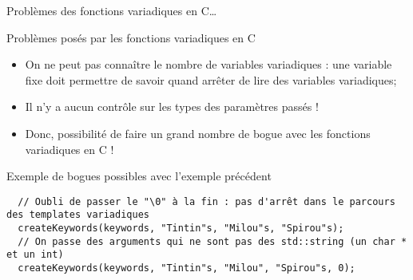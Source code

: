 \documentclass[compress,10pt,aspectratio=169]{beamer}
\begin{document}
  \begin{frame}[fragile]{Problèmes des fonctions variadiques en C\ldots}
    \scriptsize\vspace*{-3mm}
  \begin{block}{Problèmes posés par les fonctions variadiques en C}
  \begin{itemize}
  \item On ne peut pas connaître le nombre de variables variadiques : une variable
  fixe doit permettre de savoir quand arrêter de lire des variables variadiques;
  \item Il n'y a aucun contrôle sur les types des paramètres passés !
  \item Donc, possibilité de faire un grand nombre de bogue avec les fonctions
       variadiques en C !
  \end{itemize}
  \end{block}
  \begin{alertblock}{\small Exemple de bogues possibles avec l'exemple précédent}
  \begin{verbatim}
  // Oubli de passer le "\0" à la fin : pas d'arrêt dans le parcours des templates variadiques
  createKeywords(keywords, "Tintin"s, "Milou"s, "Spirou"s);
  // On passe des arguments qui ne sont pas des std::string (un char * et un int)
  createKeywords(keywords, "Tintin"s, "Milou", "Spirou"s, 0);
  \end{verbatim}
  \end{alertblock}
  \end{frame}
  
\end{document}
